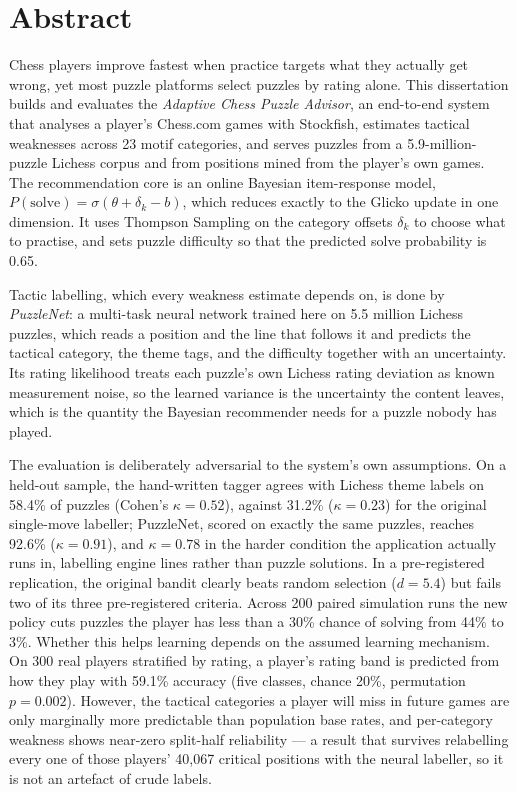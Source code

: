 \chapter*{Abstract}

Chess players improve fastest when practice targets what they actually get wrong, yet most
puzzle platforms select puzzles by rating alone. This dissertation builds and evaluates the
\emph{Adaptive Chess Puzzle Advisor}, an end-to-end system that analyses a player's Chess.com games
with Stockfish, estimates tactical weaknesses across 23 motif categories, and serves puzzles from a
5.9-million-puzzle Lichess corpus and from positions mined from the player's own games. The
recommendation core is an online Bayesian item-response model, $P(\text{solve}) =
\sigma(\theta + \delta_k - b)$, which reduces exactly to the Glicko update in one dimension. It
uses Thompson Sampling on the category offsets $\delta_k$ to choose what to practise, and sets
puzzle difficulty so that the predicted solve probability is 0.65.

Tactic labelling, which every weakness estimate depends on, is done by \emph{PuzzleNet}: a multi-task
neural network trained here on 5.5 million Lichess puzzles, which reads a position and the line that
follows it and predicts the tactical category, the theme tags, and the difficulty together with an
uncertainty. Its rating likelihood treats each puzzle's own Lichess rating deviation as known
measurement noise, so the learned variance is the uncertainty the content leaves, which is the quantity
the Bayesian recommender needs for a puzzle nobody has played.

The evaluation is deliberately adversarial to the system's own assumptions. On a held-out sample, the
hand-written tagger agrees with Lichess theme labels on 58.4\% of puzzles (Cohen's $\kappa = 0.52$),
against 31.2\% ($\kappa = 0.23$) for the original single-move labeller; PuzzleNet, scored on exactly the
same puzzles, reaches 92.6\% ($\kappa = 0.91$), and $\kappa = 0.78$ in the harder condition the
application actually runs in, labelling engine lines rather than puzzle solutions. In a pre-registered replication, the original
bandit clearly beats random selection ($d = 5.4$) but fails two of its three pre-registered
criteria. Across 200 paired simulation runs the new policy cuts puzzles the player has less than a
30\% chance of solving from 44\% to 3\%. Whether this helps learning depends on the assumed learning
mechanism. On 300 real players stratified by rating, a player's rating band is predicted from how
they play with 59.1\% accuracy (five classes, chance 20\%, permutation $p = 0.002$). However, the
tactical categories a player will miss in future games are only marginally more predictable than
population base rates, and per-category weakness shows near-zero split-half reliability --- a result
that survives relabelling every one of those players' 40{,}067 critical positions with the neural
labeller, so it is not an artefact of crude labels.

